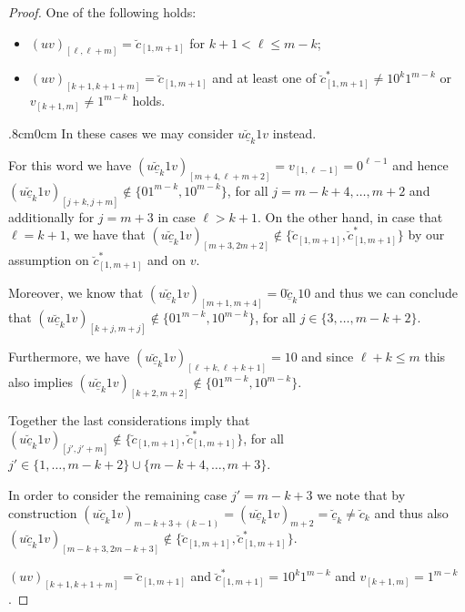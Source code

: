 \documentclass[11pt,reqno]{amsart}
\theoremstyle{plain}
\theoremstyle{definition}
\begin{document}
\begin{proof}
 One of the following holds:
\begin{itemize}
 \item $(uv)_{[\ell,\ell+m]}=\breve{c}_{[1,m+1]}$
for $k+1< \ell \leqslant  m-k$;
\item  $(uv)_{[k+1,k+1+m]}=\breve{c}_{[1,m+1]}$ and at least one of $\breve{c}^\ast_{[1,m+1]}\neq 10^{k}1^{m-k}$
or $v_{[k+1,m]}\neq 1^{m-k}$ holds.
\end{itemize}
 









\begin{adjustwidth}{.8cm}{0cm}
In these cases we may consider $u\breve{\underline{c}}_k1v$ instead. 

For this word we have $(u\breve{\underline{c}}_k1v)_{[m+4,\ell+m+2]}=v_{[1,\ell-1]}=0^{\ell-1}$ and hence
$(u\breve{\underline{c}}_k1v)_{[j+k,j+m]}\notin\{01^{m-k}, 10^{m-k}\}$, for all $j= m-k+4, \ldots, m+2$ and additionally for $j=m+3$ in case $\ell> k+1$.
On the other hand, in case that $\ell=k+1$, we have that $(u\breve{\underline{c}}_k1v)_{[m+3,2m+2]}\notin \{\breve{c}_{[1,m+1]}, \breve{c}^\ast_{[1,m+1]}\}$ by our assumption on $\breve{c}^\ast_{[1,m+1]}$ and on $v$.

Moreover, we know that 
$(u\breve{\underline{c}}_k1v)_{[m+1,m+4]}=0\breve{\underline{c}}_k10$ and thus we can conclude that
$(u\breve{\underline{c}}_k1v)_{[k+j,m+j]}\notin \{01^{m-k}, 10^{m-k}\}$, for all $j\in \{3,\ldots, m-k+2\}$.

Furthermore, we have $(u\breve{\underline{c}}_k1v)_{[\ell+k,\ell+k+1]}=10$ and since $\ell+k  \leqslant  m$ this also implies $(u\breve{\underline{c}}_k1v)_{[k+2,m+2]}\notin \{01^{m-k}, 10^{m-k}\}$. 



Together the last considerations imply that 
$(u\breve{\underline{c}}_k1v)_{[j',j'+m]}\notin \{\breve{c}_{[1,m+1]}, \breve{c}^\ast_{[1,m+1]}\}$, 
for all 
$j'\in \{1,\ldots, m-k+2\} \cup\{ m-k+4,\ldots, m+3\}$.

In order to consider the remaining case $j'=m-k+3$ we note that by construction $(u\breve{\underline{c}}_k1v)_{m-k+3+(k-1)}=(u\breve{\underline{c}}_k1v)_{m+2}=\breve{\underline{c}}_k\neq \breve{c}_k$ and thus also 
$(u\breve{\underline{c}}_k1v)_{[m-k+3,2m-k+3]}\notin \{\breve{c}_{[1,m+1]}, \breve{c}^\ast_{[1,m+1]}\}$.
\end{adjustwidth}


$(uv)_{[k+1,k+1+m]}=\breve{c}_{[1,m+1]}$ and $\breve{c}^\ast_{[1,m+1]}=10^{k}1^{m-k}$ and $v_{[k+1,m]}=1^{m-k}$.


\end{proof}
\end{document}
